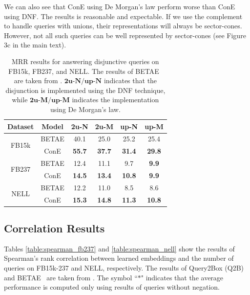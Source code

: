 \documentclass{article}
\newcommand{\betae}{{\normalsize{B}\footnotesize{ETA}\normalsize{E}}}
\begin{document}
We can also see that ConE using De Morgan's law perform worse than ConE using DNF. The results is reasonable and expectable.
If we use the complement to handle queries with unions, their representations will always be sector-cones. However, not all such queries can be well represented by sector-cones (see Figure 3c in the main text).

\begin{table}[ht]
    \centering
    \caption{MRR results for answering disjunctive queries on FB15k, FB237, and NELL. The results of \betae~ are taken from \citet{beta}. $\textbf{2u-N}/\textbf{up-N}$ indicates that the disjunction is implemented using the DNF technique, while $\textbf{2u-M}/\textbf{up-M}$ indicates the implementation using De Morgan's law.}
    \label{table:dis}
    \vspace{1mm}
    \begin{tabular}{ c c c  c c c }
        \toprule
         \textbf{Dataset}  & \textbf{Model} & \textbf{2u-N} &\textbf{2u-M} &\textbf{up-N} &\textbf{up-M}\\
        \midrule
        \multirow{2}{*}{FB15k} 
        &\betae &40.1 &25.0 &25.2 &25.4 \\
        &ConE &\textbf{55.7} &\textbf{37.7} &\textbf{31.4} &\textbf{29.8}\\
        \midrule
        \multirow{2}{*}{FB237}
        &\betae &12.4 &11.1 &9.7 &\textbf{9.9} \\
        &ConE &\textbf{14.5} &\textbf{13.4} &\textbf{10.8} &\textbf{9.9}\\
        \midrule
        \multirow{2}{*}{NELL} 
        &\betae &12.2 &11.0 &8.5 &8.6 \\
        &ConE &\textbf{15.3} &\textbf{14.8} &\textbf{11.3} &\textbf{10.8}\\
        \bottomrule
    \end{tabular}
    \vspace{-3mm}
\end{table}

\subsection{Correlation Results}
Tables \ref{table:spearman_fb237} and \ref{table:spearman_nell} show the results of Spearman's rank correlation between learned embeddings and the number of queries on FB15k-237 and NELL, respectively.  The results of Query2Box (Q2B) and \betae~ are taken from \citet{beta}. The symbol ``$*$" indicates that the average performance is computed only using results of queries without negation.
\end{document}

